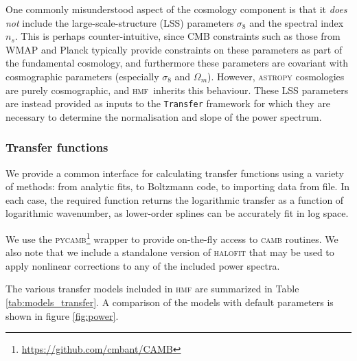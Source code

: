\documentclass[5p,aas_macros]{elsarticle}
\newcommand{\hmf}{\textsc{hmf}}
\newcommand{\bd}[1]{\textcolor{purple}{\textbf{[BD: #1]}}}
\begin{document}
One commonly misunderstood aspect of the cosmology component is that it \textit{does not} include the large-scale-structure (LSS) parameters $\sigma_8$ and the spectral index $n_s$. This is perhaps counter-intuitive, since CMB constraints such as those from WMAP and Planck typically provide constraints on these parameters as part of the fundamental cosmology, and furthermore these parameters are covariant with cosmographic parameters (especially $\sigma_8$ and $\Omega_m$). However, \textsc{astropy} cosmologies are purely cosmographic, and \hmf\ inherits this behaviour. These LSS parameters are instead provided as inputs to the \texttt{Transfer} framework for which they are necessary to determine the normalisation and slope of the power spectrum.

\subsubsection{Transfer functions}
\label{sec:halomod:components:transfer}
We provide a common interface for calculating transfer functions using a variety of methods: from analytic fits, to Boltzmann code, to importing data from file. In each case, the required function returns the logarithmic transfer as a function of logarithmic wavenumber, as lower-order splines can be accurately fit in log space. 

We use the \textsc{pycamb}\footnote{\url{https://github.com/cmbant/CAMB}} wrapper to provide on-the-fly access to \textsc{camb} routines. We also note that we include a standalone version of \textsc{halofit} that may be used to apply nonlinear corrections to any of the included power spectra.

The various transfer models included in \textsc{hmf} are summarized in Table \ref{tab:models_transfer}. A comparison of the models with default parameters is shown in figure \ref{fig:power}.

\end{document}
